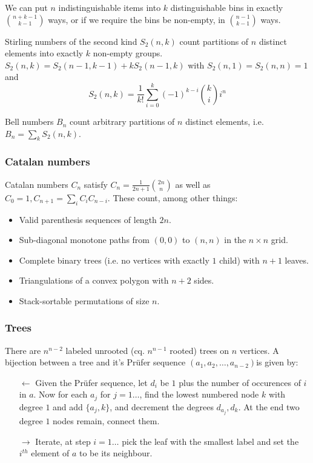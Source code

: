 \documentclass[
	a4paper,
	landscape,
	10pt,
	article
]{article}
\begin{document}
We can put $n$ indistinguishable items into $k$ distinguishable bins in exactly
$\binom{n+k-1}{k-1}$ ways, or if we require the bins be non-empty, in
$\binom{n-1}{k-1}$ ways.

Stirling numbers of the second kind $S_2(n, k)$ count partitions of $n$
distinct elements into exactly $k$ non-empty groups.
$S_2(n, k) = S_2(n-1, k-1) + kS_2(n-1, k)$ with $S_2(n, 1) = S_2(n, n) = 1$ and
$$S_2(n, k) = \frac{1}{k!}\sum_{i=0}^k (-1)^{k-i}\binom{k}{i}i^n$$

Bell numbers $B_n$ count arbitrary partitions of $n$ distinct elements, i.e.
$B_n = \sum_k S_2(n, k)$.

\subsubsection*{Catalan numbers}
Catalan numbers $C_n$ satisfy $C_n = \frac{1}{2n+1}\binom{2n}{n}$ as well
as $C_0 = 1, C_{n+1} = \sum_i C_i C_{n-i}$. These count, among other things:
\begin{itemize}
	\item Valid parenthesis sequences of length $2n$.
	\item Sub-diagonal monotone paths from $(0, 0)$ to $(n, n)$ in the
		$n\times n$ grid.
	\item Complete binary trees (i.e. no vertices with exactly $1$ child)
		with $n+1$ leaves.
	\item Triangulations of a convex polygon with $n+2$ sides.
	\item Stack-sortable permutations of size $n$.
\end{itemize}

\subsubsection*{Trees}
There are $n^{n-2}$ labeled unrooted (cq. $n^{n-1}$ rooted) trees on $n$
vertices. A bijection between a tree and it's Pr\"ufer sequence
$(a_1, a_2, \dots, a_{n-2})$is given by:
\begin{enumerate}
	\item[$\leftarrow$] Given the Pr\"ufer sequence, let $d_i$ be $1$ plus the
		number of occurences of $i$ in $a$. Now for each $a_j$ for $j=1\dots$,
		find the lowest
		numbered node $k$ with degree $1$ and add $\{a_j, k\}$, and decrement
		the degrees $d_{a_j}, d_k$. At the end two degree $1$ nodes remain,
		connect them.
	\item[$\rightarrow$] Iterate, at step $i=1\dots$ pick the leaf with the
		smallest label and set the $i^{th}$ element of $a$ to be its
		neighbour.
\end{enumerate}
\end{document}
